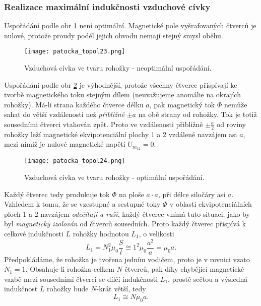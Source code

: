      \subsubsection{Realizace maximální indukčnosti vzduchové cívky}
        Uspořádání podle obr \ref{es:fig_patocka_topol23} není optimální. Magnetické pole 
        vyšrafovaných čtverců je nulové, protože proudy podél jejich obvodu nemají stejný smysl 
        oběhu.
        \begin{figure}[ht!]
          \centering  
          \texttt{[image: patocka\_topol23.png]}
          \caption{Vzduchová cívka ve tvaru rohožky - neoptimální uspořádání.    
                   \cite[s.~59]{Patocka4}} 
          \label{es:fig_patocka_topol23}
        \end{figure}
        Uspořádání podle obr \ref{es:fig_patocka_topol24} je výhodnější, protože všechny čtverce 
        přispívají ke tvorbě magnetického toku stejným dílem (neuvažujeme anomálie na okrajích 
        rohožky). Má-li strana každého čtverce délku \(a\), pak magnetický tok \(\Phi\) nemůže 
        sahat do  větší vzdálenosti než \emph{přibližně} \(\pm a\) na obě strany od rohožky. Tok je 
        totiž sousedními čtverci vtahován zpět. Proto ve vzdálenosti přibližně \(\pm \frac{a}{2}\) 
        od roviny rohožky leží magnetické ekvipotenciální plochy 1 a 2 vzdálené navzájem asi \(a\), 
        mezi nimiž je nulové magnetické napětí \(U_{m_{12}} = 0\).
        \begin{figure}[ht!]
          \centering  
          \texttt{[image: patocka\_topol24.png]}
          \caption{Vzduchová cívka ve tvaru rohožky - optimální uspořádání.
                   \cite[s.~60]{Patocka4}} 
          \label{es:fig_patocka_topol24}
        \end{figure}
        
        Každý čtverec tedy produkuje tok \(\Phi\) na ploše \(a\cdot a\), při délce siločáry asi 
        \(a\). Vzhledem k tomu, že se vzestupné a sestupné toky \(\Phi\) v oblasti 
        ekvipotenciálních ploch 1 a 2 navzájem \emph{odečítají a ruší}, každý čtverec vnímá tuto 
        situaci, jako by byl \emph{magneticky izolován} od čtverců sousedních. Proto každý čtverec 
        přispívá k celkové indukčnosti \(L\) rohožky hodnotou \(L_1\), o velikosti
        \begin{equation}\label{ES:eq_topol19}
          L_1 = N_1^2\mu_0\frac{S}{l} \cong 1^2\mu_0\frac{a^2}{a} = \mu_0a.
        \end{equation} 
        Předpokládáme, že rohožka je tvořena jedním vodičem, proto je v rovnici vzato \(N_1 = 1\). 
        Obsahuje-li rohožka celkem \(N\) čtverců, pak díky chybějící magnetické vazbě mezi 
        sousedními čtverci se dílčí indukčnosti \(L_1\), prostě sečtou a výsledná indukčnost \(L\) 
        rohožky bude \(N\)-krát větší, tedy
        \begin{equation}\label{ES:eq_topol20}
          L_1 \cong N\mu_0a.
        \end{equation} 

